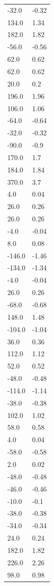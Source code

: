 \begin{longtable}{ll}
-32.0 & -0.32 \\
134.0 & 1.34 \\
182.0 & 1.82 \\
-56.0 & -0.56 \\
62.0 & 0.62 \\
62.0 & 0.62 \\
20.0 & 0.2 \\
196.0 & 1.96 \\
106.0 & 1.06 \\
-64.0 & -0.64 \\
-32.0 & -0.32 \\
-90.0 & -0.9 \\
170.0 & 1.7 \\
184.0 & 1.84 \\
370.0 & 3.7 \\
4.0 & 0.04 \\
26.0 & 0.26 \\
26.0 & 0.26 \\
-4.0 & -0.04 \\
8.0 & 0.08 \\
-146.0 & -1.46 \\
-134.0 & -1.34 \\
-4.0 & -0.04 \\
26.0 & 0.26 \\
-68.0 & -0.68 \\
148.0 & 1.48 \\
-104.0 & -1.04 \\
36.0 & 0.36 \\
112.0 & 1.12 \\
52.0 & 0.52 \\
-48.0 & -0.48 \\
-114.0 & -1.14 \\
-38.0 & -0.38 \\
102.0 & 1.02 \\
58.0 & 0.58 \\
4.0 & 0.04 \\
-58.0 & -0.58 \\
2.0 & 0.02 \\
-48.0 & -0.48 \\
-46.0 & -0.46 \\
-10.0 & -0.1 \\
-38.0 & -0.38 \\
-34.0 & -0.34 \\
24.0 & 0.24 \\
182.0 & 1.82 \\
226.0 & 2.26 \\
98.0 & 0.98 \\

\end{longtable}
